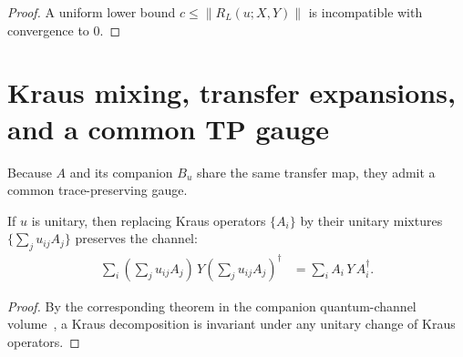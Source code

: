 \begin{proof}
    \leanok
    A uniform lower bound $c \le \|R_L(u;X,Y)\|$ is incompatible with
    convergence to $0$.
\end{proof}


\section{Kraus mixing, transfer expansions, and a common TP gauge}
\label{sec:app_symmetry_common_tp_gauge}

Because $A$ and its companion $B_u$ share the same transfer map, they admit a
common trace-preserving gauge.

\begin{lemma}\label{lem:unitary_kraus_mixing}
    \leanok
    If $u$ is unitary, then replacing Kraus operators $\{A_i\}$ by
    their unitary mixtures $\{\sum_j u_{ij} A_j\}$ preserves the
    channel:
    \begin{align}
        \sum_i \left(\sum_j u_{ij} A_j\right)\, Y
        \left(\sum_j u_{ij} A_j\right)^\dagger
         & =
        \sum_i A_i\, Y\, A_i^\dagger.
        \label{eq:symmetry_unitary_kraus_mixing}
    \end{align}
\end{lemma}

\begin{proof}
    \leanok
    By the corresponding theorem in the companion quantum-channel volume~\cite[``Unitary freedom in Kraus operators'']{QICLean2026Blueprint}, a Kraus
    decomposition is invariant under any unitary change of Kraus operators.
\end{proof}


